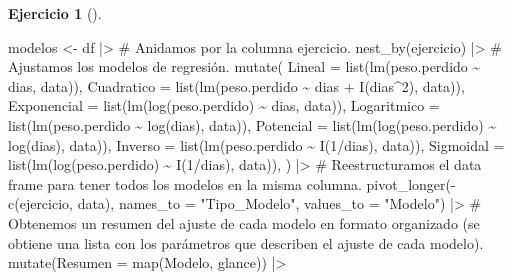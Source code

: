 \documentclass[
  spanish,
  a4paper,
]{scrreport}
\newenvironment{Shaded}{\begin{snugshade}}{\end{snugshade}}
\newcommand{\AttributeTok}[1]{\textcolor[rgb]{0.40,0.45,0.13}{#1}}
\newcommand{\CommentTok}[1]{\textcolor[rgb]{0.37,0.37,0.37}{#1}}
\newcommand{\DecValTok}[1]{\textcolor[rgb]{0.68,0.00,0.00}{#1}}
\newcommand{\FunctionTok}[1]{\textcolor[rgb]{0.28,0.35,0.67}{#1}}
\newcommand{\NormalTok}[1]{\textcolor[rgb]{0.00,0.23,0.31}{#1}}
\newcommand{\OtherTok}[1]{\textcolor[rgb]{0.00,0.23,0.31}{#1}}
\newcommand{\SpecialCharTok}[1]{\textcolor[rgb]{0.37,0.37,0.37}{#1}}
\newcommand{\StringTok}[1]{\textcolor[rgb]{0.13,0.47,0.30}{#1}}
\theoremstyle{definition}
\newtheorem{exercise}{Ejercicio}[chapter]
\theoremstyle{remark}
\begin{document}
\begin{exercise}[]
\begin{enumerate}
\begin{tcolorbox}
\begin{Shaded}
\begin{Highlighting}[]
\NormalTok{modelos }\OtherTok{\textless{}{-}}\NormalTok{ df  }\SpecialCharTok{|\textgreater{}} 
    \CommentTok{\# Anidamos por la columna ejercicio.}
    \FunctionTok{nest\_by}\NormalTok{(ejercicio)  }\SpecialCharTok{|\textgreater{}} 
    \CommentTok{\# Ajustamos los modelos de regresión.}
    \FunctionTok{mutate}\NormalTok{(}
        \AttributeTok{Lineal =} \FunctionTok{list}\NormalTok{(}\FunctionTok{lm}\NormalTok{(peso.perdido }\SpecialCharTok{\textasciitilde{}}\NormalTok{ dias, data)),}
        \AttributeTok{Cuadratico =} \FunctionTok{list}\NormalTok{(}\FunctionTok{lm}\NormalTok{(peso.perdido }\SpecialCharTok{\textasciitilde{}}\NormalTok{ dias }\SpecialCharTok{+} \FunctionTok{I}\NormalTok{(dias}\SpecialCharTok{\^{}}\DecValTok{2}\NormalTok{), data)),}
        \AttributeTok{Exponencial =} \FunctionTok{list}\NormalTok{(}\FunctionTok{lm}\NormalTok{(}\FunctionTok{log}\NormalTok{(peso.perdido) }\SpecialCharTok{\textasciitilde{}}\NormalTok{ dias, data)),}
        \AttributeTok{Logaritmico =} \FunctionTok{list}\NormalTok{(}\FunctionTok{lm}\NormalTok{(peso.perdido }\SpecialCharTok{\textasciitilde{}} \FunctionTok{log}\NormalTok{(dias), data)),}
        \AttributeTok{Potencial =} \FunctionTok{list}\NormalTok{(}\FunctionTok{lm}\NormalTok{(}\FunctionTok{log}\NormalTok{(peso.perdido) }\SpecialCharTok{\textasciitilde{}} \FunctionTok{log}\NormalTok{(dias), data)),}
        \AttributeTok{Inverso =} \FunctionTok{list}\NormalTok{(}\FunctionTok{lm}\NormalTok{(peso.perdido }\SpecialCharTok{\textasciitilde{}} \FunctionTok{I}\NormalTok{(}\DecValTok{1}\SpecialCharTok{/}\NormalTok{dias), data)),}
        \AttributeTok{Sigmoidal =} \FunctionTok{list}\NormalTok{(}\FunctionTok{lm}\NormalTok{(}\FunctionTok{log}\NormalTok{(peso.perdido) }\SpecialCharTok{\textasciitilde{}} \FunctionTok{I}\NormalTok{(}\DecValTok{1}\SpecialCharTok{/}\NormalTok{dias), data)),}
\NormalTok{    )  }\SpecialCharTok{|\textgreater{}} 
    \CommentTok{\# Reestructuramos el data frame para tener todos los modelos en la misma columna.}
    \FunctionTok{pivot\_longer}\NormalTok{(}\SpecialCharTok{{-}}\FunctionTok{c}\NormalTok{(ejercicio, data), }\AttributeTok{names\_to =} \StringTok{"Tipo\_Modelo"}\NormalTok{, }\AttributeTok{values\_to =} \StringTok{"Modelo"}\NormalTok{)  }\SpecialCharTok{|\textgreater{}} 
    \CommentTok{\# Obtenemos un resumen del ajuste de cada modelo en formato organizado (se obtiene una lista con los parámetros que describen el ajuste de cada modelo).}
    \FunctionTok{mutate}\NormalTok{(}\AttributeTok{Resumen =} \FunctionTok{map}\NormalTok{(Modelo, glance)) }\SpecialCharTok{|\textgreater{}} 

\end{Highlighting}
\end{Shaded}
\end{tcolorbox}
\end{enumerate}
\end{exercise}
\end{document}
